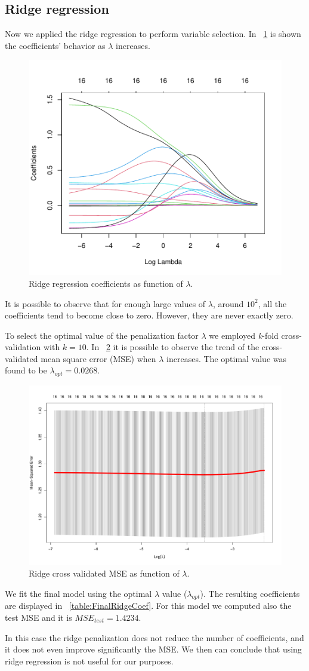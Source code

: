 \subsection{Ridge regression}

Now we applied the ridge regression to perform variable selection. In \Fig~\ref{fig:RidgeCoefVsLambda} is shown the coefficients' behavior as $\lambda$ increases. 

\begin{figure}[h]
	\centering
	\includegraphics[width=0.4\linewidth]{ImageFiles/Regression/Ridge/RidgeCoefVsLambda.pdf}
	\caption{Ridge regression coefficients as function of $\lambda$.}
	\label{fig:RidgeCoefVsLambda}
\end{figure}

It is possible to observe that for enough large values of $\lambda$, around $10^2$, all the coefficients tend to become close to zero. However, they are never exactly zero.

To select the optimal value of the penalization factor $\lambda$ we employed \textit{k}-fold cross-validation with $\textit{k}=10$. In \Fig~\ref{fig:RidgeCvPlot} it is possible to observe the trend of the cross-validated mean square error (MSE) when $\lambda$ increases. The optimal value was found to be $\lambda_{opt} = 0.0268$.

\begin{figure}[H]
	\centering
	\includegraphics[width=0.7\linewidth]{ImageFiles/Regression/Ridge/RidgeCvPlot.pdf}
	\caption{Ridge cross validated MSE as function of $\lambda$.}
	\label{fig:RidgeCvPlot}
\end{figure}

We fit the final model using the optimal $\lambda$ value ($\lambda_{opt}$). The resulting coefficients are displayed in \Tab~\ref{table:FinalRidgeCoef}. For this model we computed also the test MSE and it is $MSE_{test} = 1.4234$.

In this case the ridge penalization does not reduce the number of coefficients, and it does not even improve significantly the MSE. We then can conclude that using ridge regression is not useful for our purposes.
